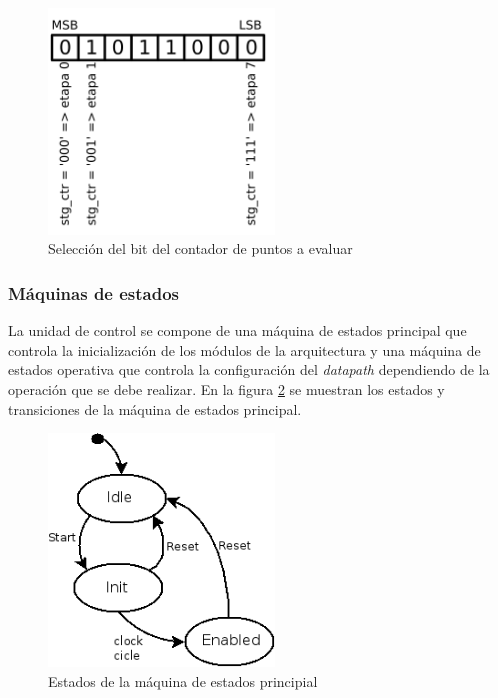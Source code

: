 
\begin{figure}[htb!]
        \centering
        \includegraphics[width=6cm]{./figures/r2conts.png}
        \caption{Selección del bit del contador de puntos a evaluar}
        \label{fig:r2conts}
\end{figure}


\subsubsection{Máquinas de estados}

La unidad de control se compone de una máquina de estados principal que controla la inicialización
de los módulos de la arquitectura y una máquina de estados operativa que controla la
configuración del \textit{datapath} dependiendo de la operación que se debe realizar.
En la figura \ref{fig:mainSMr2} se muestran los estados y transiciones de la máquina de estados
principal.

\begin{figure}[htb!]
        \centering
        \includegraphics[width=6cm]{./figures/SMr2gen.png}
        \caption{Estados de la máquina de estados principial}
        \label{fig:mainSMr2}
\end{figure}


